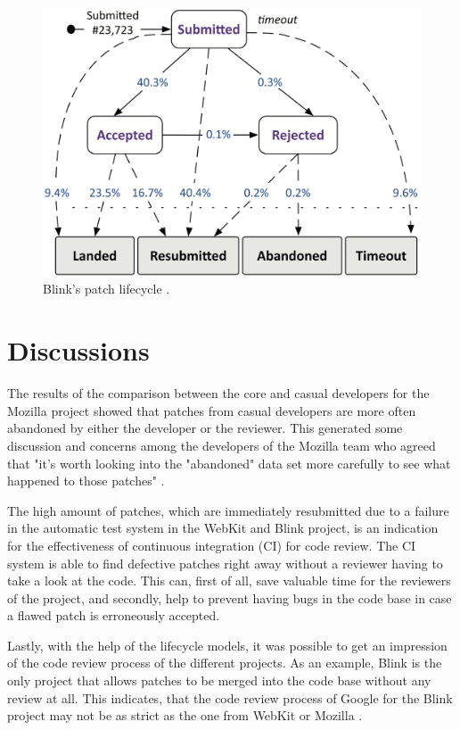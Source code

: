 \documentclass[conference]{IEEEtran}
\begin{document}
\begin{figure}
    \centering
    \includegraphics[scale=0.25]{img/blink.png}
    \caption{Blink's patch lifecycle \cite{baysal2015synthesizing}.}
    \label{fig:blink}
\end{figure}

\section{Discussions}

The results of the comparison between the core and casual developers for the Mozilla project showed that patches from casual developers are more often abandoned by either the developer or the reviewer. This generated some discussion and concerns among the developers of the Mozilla team who agreed that "it's worth looking into the "abandoned" data set more carefully to see what happened to those patches" \cite{baysal2015synthesizing}.

The high amount of patches, which are immediately resubmitted due to a failure in the automatic test system in the WebKit and Blink project, is an indication for the effectiveness of continuous integration (CI) for code review. The CI system is able to find defective patches right away without a reviewer having to take a look at the code. This can, first of all, save valuable time for the reviewers of the project, and secondly, help to prevent having bugs in the code base in case a flawed patch is erroneously accepted.

Lastly, with the help of the lifecycle models, it was possible to get an impression of the code review process of the different projects. As an example, Blink is the only project that allows patches to be merged into the code base without any review at all. This indicates, that the code review process of Google for the Blink project may not be as strict as the one from WebKit or Mozilla \cite{baysal2015synthesizing}.
\end{document}

